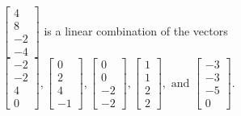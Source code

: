 \begin{exercise}
\begin{exerciseStatement}
  \end{exerciseStatement}
  \begin{exerciseAnswer}
   \(\left[\begin{array}{c}
4 \\
8 \\
-2 \\
-4
\end{array}\right]\) 
  	 is  
	a linear combination of the vectors \(\left[\begin{array}{c}
-2 \\
-2 \\
4 \\
0
\end{array}\right] , \left[\begin{array}{c}
0 \\
2 \\
4 \\
-1
\end{array}\right] , \left[\begin{array}{c}
0 \\
0 \\
-2 \\
-2
\end{array}\right] , \left[\begin{array}{c}
1 \\
1 \\
2 \\
2
\end{array}\right] , \text{ and } \left[\begin{array}{c}
-3 \\
-3 \\
-5 \\
0
\end{array}\right]\).

	
  


  \end{exerciseAnswer}
\end{exercise}